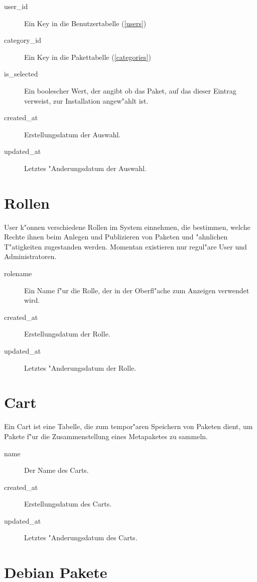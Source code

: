 \documentclass{article}
\begin{document}
\begin{description}
\item[user\_id] Ein Key in die Benutzertabelle (\ref{users})
\item[category\_id] Ein Key in die Pakettabelle (\ref{categories})
\item[is\_selected] Ein boolescher Wert, der angibt ob das Paket, auf das dieser Eintrag verweist, zur Installation angew"ahlt ist.
\item[created\_at] Erstellungsdatum der Auswahl.
\item[updated\_at] Letztes "Anderungsdatum der Auswahl.
\end{description}

\section{Rollen}
\label{roles}

User k"onnen verschiedene Rollen im System einnehmen, die bestimmen, welche Rechte ihnen beim Anlegen und Publizieren von Paketen und "ahnlichen T"atigkeiten zugestanden werden. Momentan existieren nur regul"are User und Administratoren.

\begin{description}
\item[rolename] Ein Name f"ur die Rolle, der in der Oberfl"ache zum Anzeigen verwendet wird.
\item[created\_at] Erstellungsdatum der Rolle.
\item[updated\_at] Letztes "Anderungsdatum der Rolle.
\end{description}

\section{Cart}
\label{carts}

Ein Cart ist eine Tabelle, die zum tempor"aren Speichern von Paketen dient, um Pakete f"ur die Zusammenstellung eines Metapaketes zu sammeln.

\begin{description}
\item[name] Der Name des Carts.
\item[created\_at] Erstellungsdatum des Carts.
\item[updated\_at] Letztes "Anderungsdatum des Carts.
\end{description}

\section{Debian Pakete}
\end{document}
